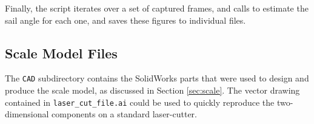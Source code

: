 \documentclass[letterpaper, 10 pt, conference]{ieeeconf}  %
\begin{document}
Finally, the script  iterates over a set of captured frames, and calls   to estimate the sail angle for each one, and saves these figures to individual files.
\subsection{Scale Model Files}
The \verb=CAD= subdirectory contains the SolidWorks parts that were used to design and produce the scale model, as discussed in Section \ref{sec:scale}. The vector drawing contained in \verb=laser_cut_file.ai= could be used to quickly reproduce the two-dimensional components on a standard laser-cutter. 
\end{document}
